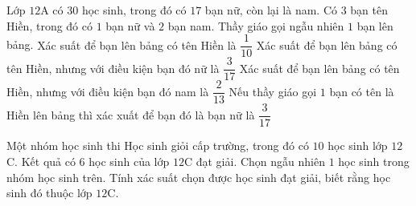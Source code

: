 \begin{ex}%
	Lớp $12$A có $30$ học sinh, trong đó có $17$ bạn nữ, còn lại là nam. Có $3$ bạn tên Hiền, trong đó có $1$ bạn nữ và $2$ bạn  nam. Thầy giáo gọi ngẫu nhiên $1$ bạn lên bảng.
	\choiceTF 
		{\True Xác  suất để bạn lên bảng có tên Hiền là $\dfrac{1}{10}$}
		{Xác suất để bạn lên bảng có tên Hiền, nhưng với điều kiện bạn đó nữ là $\dfrac{3}{17}$} 
		{\True Xác suất để bạn lên bảng có tên Hiền, nhưng với điều kiện bạn đó nam  là $\dfrac{2}{13}$}
		{Nếu thầy giáo gọi $1$ bạn có tên là Hiền lên bảng thì xác xuất để bạn  đó là bạn nữ là $\dfrac{3}{17}$}
\end{ex}



\begin{bt}%
	Một nhóm học sinh thi Học sinh giỏi cấp trường, trong đó có $10$ học sinh lớp $12$C. Kết quả có $6$ học sinh của lớp  $12$C đạt giải. Chọn ngẫu nhiên $1$ học sinh trong nhóm học sinh trên. Tính xác suất chọn được học sinh đạt giải, biết rằng học sinh đó thuộc lớp $12$C.
\end{bt}

